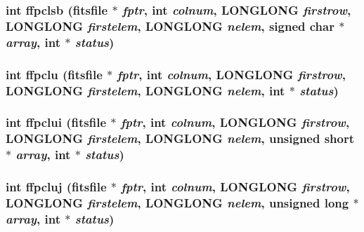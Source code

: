 \subsubsection{\setlength{\rightskip}{0pt plus 5cm}int ffpclsb (\bf{fitsfile} $\ast$ {\em fptr}, int {\em colnum}, \bf{LONGLONG} {\em firstrow}, \bf{LONGLONG} {\em firstelem}, \bf{LONGLONG} {\em nelem}, signed char $\ast$ {\em array}, int $\ast$ {\em status})}\label{test_2roimasker_2fitsio_8h_3c19da60283d0f6c16d2c4508ee2b551}


\subsubsection{\setlength{\rightskip}{0pt plus 5cm}int ffpclu (\bf{fitsfile} $\ast$ {\em fptr}, int {\em colnum}, \bf{LONGLONG} {\em firstrow}, \bf{LONGLONG} {\em firstelem}, \bf{LONGLONG} {\em nelem}, int $\ast$ {\em status})}\label{test_2roimasker_2fitsio_8h_d0b72bec18b86400b6610d40ef80e0a4}


\subsubsection{\setlength{\rightskip}{0pt plus 5cm}int ffpclui (\bf{fitsfile} $\ast$ {\em fptr}, int {\em colnum}, \bf{LONGLONG} {\em firstrow}, \bf{LONGLONG} {\em firstelem}, \bf{LONGLONG} {\em nelem}, unsigned short $\ast$ {\em array}, int $\ast$ {\em status})}\label{test_2roimasker_2fitsio_8h_dbc957468fec6139e57ddb838f5782a7}


\subsubsection{\setlength{\rightskip}{0pt plus 5cm}int ffpcluj (\bf{fitsfile} $\ast$ {\em fptr}, int {\em colnum}, \bf{LONGLONG} {\em firstrow}, \bf{LONGLONG} {\em firstelem}, \bf{LONGLONG} {\em nelem}, unsigned long $\ast$ {\em array}, int $\ast$ {\em status})}\label{test_2roimasker_2fitsio_8h_93be7636ae678f27fed9c25ca171c009}


